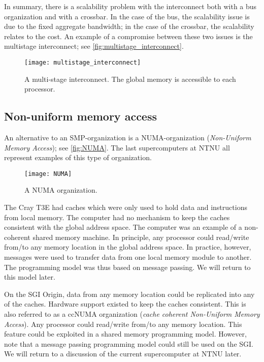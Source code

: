 In summary, there is a scalability problem with the interconnect both with a bus
organization and with a crossbar. In the case of the bus, the scalability issue
is due to the fixed aggregate bandwidth; in the case of the crossbar, the
scalability relates to the cost. An example of a compromise between these two
issues is the multistage interconnect; see
\autoref{fig:multistage_interconnect}.

\begin{figure}[htbp]
  \begin{center}
    \texttt{[image: multistage\_interconnect]}
  \end{center}
  \caption{
    A multi-stage interconnect. The global memory is accessible to each processor.
  }
  \label{fig:multistage_interconnect}
\end{figure}

\subsection{Non-uniform memory access}

An alternative to an SMP-organization is a NUMA-organization (\emph{Non-Uniform
Memory Access}); see \autoref{fig:NUMA}. The last supercomputers at NTNU all
represent examples of this type of organization.

\begin{figure}[htbp]
  \begin{center}
    \texttt{[image: NUMA]}
  \end{center}
  \caption{A NUMA organization.}
  \label{fig:NUMA}
\end{figure}

The Cray T3E had caches which were only used to hold data and instructions from
local memory. The computer had no mechanism to keep the caches consistent with
the global address space. The computer was an example of a non-coherent shared
memory machine. In principle, any processor could read/write from/to any memory
location in the global address space. In practice, however, messages were used
to transfer data from one local memory module to another. The programming model
was thus based on message passing. We will return to this model later.

On the SGI Origin, data from any memory location could be replicated into any of
the caches. Hardware support existed to keep the caches consistent. This is also
referred to as a ccNUMA organization (\emph{cache coherent Non-Uniform Memory
Access}). Any processor could read/write from/to any memory location. This
feature could be exploited in a shared memory programming model. However, note
that a message passing programming model could still be used on the SGI. We will
return to a discussion of the current supercomputer at NTNU later.

